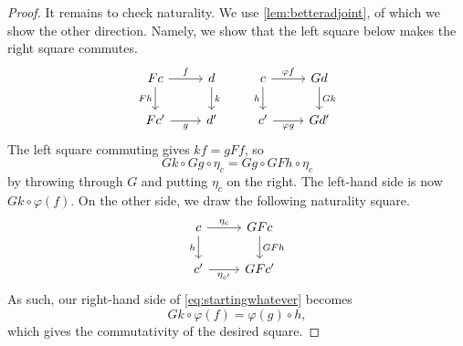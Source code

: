 \documentclass[../notes.tex]{subfiles}
\begin{document}
\begin{proof}
	It remains to check naturality. We use \autoref{lem:betteradjoint}, of which we show the other direction. Namely, we show that the left square below makes the right square commutes.
	\[\begin{tikzcd}[ampersand replacement=\&]
		Fc \& d \& c \& Gd \\
		{Fc'} \& {d'} \& {c'} \& {Gd'}
		\arrow["{f}", from=1-1, to=1-2]
		\arrow["{g}"', from=2-1, to=2-2]
		\arrow["Fh"', from=1-1, to=2-1]
		\arrow["k", from=1-2, to=2-2]
		\arrow["h"', from=1-3, to=2-3]
		\arrow["{\varphi f}", from=1-3, to=1-4]
		\arrow["{\varphi g}"', from=2-3, to=2-4]
		\arrow["Gk", from=1-4, to=2-4]
	\end{tikzcd}\]
	The left square commuting gives $kf=gFf$, so
	\[Gk\circ Gg\circ\eta_c=Gg\circ GFh\circ\eta_c\tag{$*$}\label{eq:startingwhatever}\]
	by throwing through $G$ and putting $\eta_c$ on the right. The left-hand side is now $Gk\circ\varphi(f)$. On the other side, we draw the following naturality square.
	\[\begin{tikzcd}
		c & GFc \\
		{c'} & {GFc'}
		\arrow["h"', from=1-1, to=2-1]
		\arrow["GFh", from=1-2, to=2-2]
		\arrow["{\eta_c}", from=1-1, to=1-2]
		\arrow["{\eta_{c'}}"', from=2-1, to=2-2]
	\end{tikzcd}\]
	As such, our right-hand side of \autoref{eq:startingwhatever} becomes
	\[Gk\circ\varphi(f)=\varphi(g)\circ h,\]
	which gives the commutativity of the desired square.
\end{proof}
\end{document}
